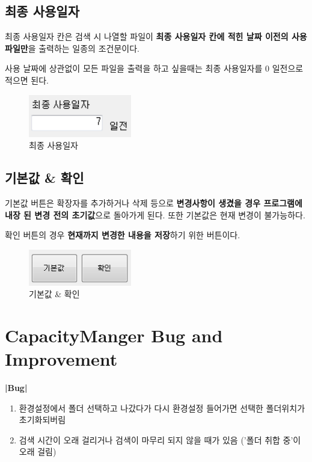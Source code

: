 \documentclass[a4paper, 13pt]{article} %
\begin{document}
		\subsection{최종 사용일자}	
		최종 사용일자 칸은 검색 시 나열할 파일이 \textbf{최종 사용일자 칸에 적힌 날짜 이전의 사용 파일만}을 출력하는 일종의 조건문이다.
		
		사용 날짜에 상관없이 모든 파일을 출력을 하고 싶을때는 최종 사용일자를 0 일전으로 적으면 된다.
		
		\begin{figure}[h]
			\centering
			\includegraphics[width=0.4\textwidth]{Figures/date}
			\caption{최종 사용일자}
			\label{fig:date}
		\end{figure}
	
		\newpage
	
		\subsection{기본값 \& 확인}
		기본값 버튼은 확장자를 추가하거나 삭제 등으로 \textbf{변경사항이 생겼을 경우 프로그램에 내장 된 변경 전의 초기값}으로 돌아가게 된다. 또한 기본값은 현재 변경이 불가능하다.
		
		확인 버튼의 경우 \textbf{현재까지 변경한 내용을 저장}하기 위한 버튼이다.
		
		\begin{figure}[h]
			\centering
			\includegraphics[width=0.4\textwidth]{Figures/button}
			\caption{기본값 \& 확인}
			\label{fig:button}
		\end{figure}
	
	\clearpage
	\section{CapacityManger Bug and Improvement}

		
		\LARGE \bf |Bug| \newline
		
		\begin{enumerate}
		\large
		
		\item 환경설정에서 폴더 선택하고 나갔다가 다시 환경설정 들어가면
		선택한 폴더위치가 초기화되버림 \newline
		
		\item 검색 시간이 오래 걸리거나 검색이 마무리 되지 않을 때가 있음
		('폴더 취합 중'이 오래 걸림) \newline \newline
		
	\end{enumerate}
		
\end{document}
